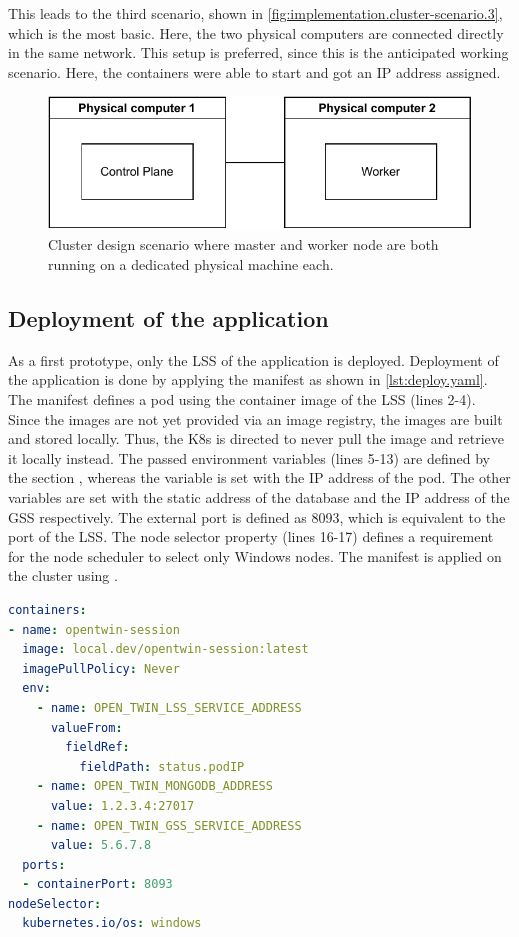 This leads to the third scenario, shown in \autoref{fig:implementation.cluster-scenario.3}, which is the most basic. Here, the two physical computers are connected directly in the same network. This setup is preferred, since this is the anticipated working scenario. Here, the containers were able to start and got an \ac{IP} address assigned.
\begin{figure}[h]
	\centering
	\includegraphics[width=.8\textwidth]{Figures/Cluster-scenarios-3.pdf}
	\caption{Cluster design scenario where master and worker node are both running on a dedicated physical machine each.}
	\label{fig:implementation.cluster-scenario.3}
\end{figure}


\subsection{Deployment of the application}
As a first prototype, only the \ac{LSS} of the application is deployed. 
Deployment of the application is done by applying the manifest as shown in \autoref{lst:deploy.yaml}.
The manifest defines a pod using the container image of the \ac{LSS} (lines 2-4). Since the images are not yet provided via an image registry, the images are built and stored locally. Thus, the \ac{K8s} is directed to never pull the image and retrieve it locally instead.
The passed environment variables (lines 5-13) are defined by the section , whereas the variable  is set with the \ac{IP} address of the pod. The other variables are set with the static address of the database and the \ac{IP} address of the \ac{GSS} respectively. The external port is defined as 8093, which is equivalent to the port of the \ac{LSS}.
The node selector property (lines 16-17) defines a requirement for the node scheduler to select only \ac{Windows} nodes.
The manifest is applied on the cluster using .
\begin{lstlisting}[label=lst:deploy.yaml, caption={Partial section of configuration for cluster deployment of the \ac{LSS} (\textit{Distribution/Kubernetes/open\_twin.yaml})}, language=yaml]
containers:
- name: opentwin-session
  image: local.dev/opentwin-session:latest
  imagePullPolicy: Never
  env:
    - name: OPEN_TWIN_LSS_SERVICE_ADDRESS
      valueFrom:
        fieldRef:
          fieldPath: status.podIP
    - name: OPEN_TWIN_MONGODB_ADDRESS
      value: 1.2.3.4:27017
    - name: OPEN_TWIN_GSS_SERVICE_ADDRESS
      value: 5.6.7.8
  ports:
  - containerPort: 8093
nodeSelector:
  kubernetes.io/os: windows
\end{lstlisting}

